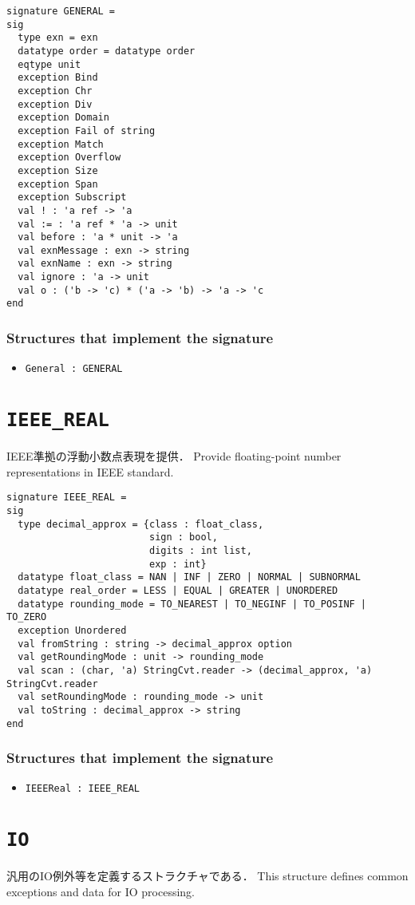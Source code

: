 \documentclass{jbook}
\newcommand{\txt}[2]{#2}
\newcommand{\code}[1]{\mbox{\large\tt #1}}
\newcommand{\signature}[2]{
\section{{\tt #1}}\label{section:reference:#2}
}
\newcommand{\Structure}{\subsubsection*{\txt{シグネチャを実装するストラクチャ}{Structures that implement the signature}}}
\begin{document}
\begin{verbatim}
signature GENERAL =
sig
  type exn = exn
  datatype order = datatype order
  eqtype unit
  exception Bind
  exception Chr
  exception Div
  exception Domain
  exception Fail of string
  exception Match
  exception Overflow
  exception Size
  exception Span
  exception Subscript
  val ! : 'a ref -> 'a
  val := : 'a ref * 'a -> unit
  val before : 'a * unit -> 'a
  val exnMessage : exn -> string
  val exnName : exn -> string
  val ignore : 'a -> unit
  val o : ('b -> 'c) * ('a -> 'b) -> 'a -> 'c
end
\end{verbatim}

\Structure
\begin{itemize}
\item \code{General : GENERAL}
\end{itemize}

\signature{IEEE\_REAL}{IEEEREAL}
\ifjp%
	IEEE準拠の浮動小数点表現を提供．
\else%
	Provide floating-point number representations in IEEE standard.
\fi%

\begin{verbatim}
signature IEEE_REAL =
sig
  type decimal_approx = {class : float_class,
                         sign : bool,
                         digits : int list,
                         exp : int}
  datatype float_class = NAN | INF | ZERO | NORMAL | SUBNORMAL
  datatype real_order = LESS | EQUAL | GREATER | UNORDERED
  datatype rounding_mode = TO_NEAREST | TO_NEGINF | TO_POSINF | TO_ZERO
  exception Unordered
  val fromString : string -> decimal_approx option
  val getRoundingMode : unit -> rounding_mode
  val scan : (char, 'a) StringCvt.reader -> (decimal_approx, 'a) StringCvt.reader
  val setRoundingMode : rounding_mode -> unit
  val toString : decimal_approx -> string
end
\end{verbatim}

\Structure
\begin{itemize}
\item \code{IEEEReal : IEEE\_REAL}
\end{itemize}

\signature{IO}{IO}
\ifjp%
	汎用のIO例外等を定義するストラクチャである．
\else%
	This structure defines common exceptions and data for IO processing.
\fi%
\end{document}
